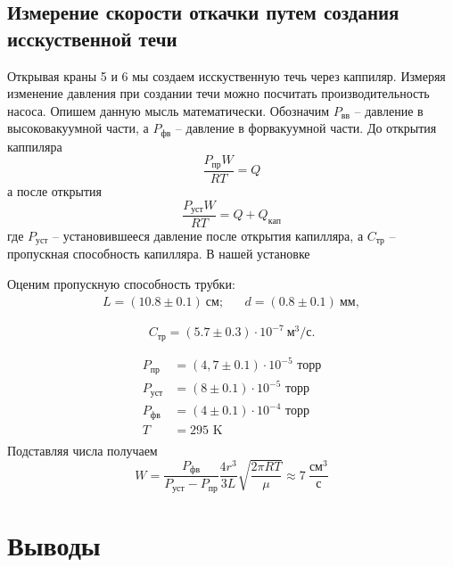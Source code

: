 \documentclass[a4paper,12pt]{article}
\begin{document}
    \newpage

    \subsection*{Измерение скорости откачки путем создания исскуственной течи}
    Открывая краны 5 и 6 мы создаем исскуственную течь через каппиляр. Измеряя изменение давления при создании течи можно посчитать производительность насоса. Опишем данную мысль математически. Обозначим $P_{вв}$ -- давление в высоковакуумной части, а $P_{фв}$ -- давление в форвакуумной части. До открытия каппиляра
    \begin{equation}
        \frac{P_{пр}W}{RT} = Q
    \end{equation}
    а после открытия
    \begin{equation}
        \frac{P_{уст}W}{RT} = Q + Q_{кап}
    \end{equation}
    где $P_{уст}$ -- установившееся давление после открытия капилляра, а $C_{тр}$ -- пропускная способность капилляра. В нашей установке

        Оценим пропускную способность трубки:
		\begin{align}
			L = (10.8 \pm 0.1)~ см; &&   d = (0.8 \pm 0.1) ~ мм,
		\end{align}
		
		\begin{equation}
			C_{тр} = (5.7 \pm 0.3) \cdot  10^{-7} ~ м^3 / с.
		\end{equation}



    \begin{align*}
        P_{пр}&=(4,7 \pm 0.1)\cdot10^{-5} \text{ торр}\\
        P_{уст}&=(8 \pm 0.1)\cdot10^{-5} \text{ торр}\\
        P_{фв}&=(4 \pm 0.1)\cdot 10^{-4} \text{ торр}\\
        T&=295 \text{ K}\\
    \end{align*}
    Подставляя числа получаем
    \begin{equation}
        W = \frac{P_{фв}}{P_{уст}-P_{пр}}\frac{4r^3}{3L}\sqrt{\frac{2\pi RT}{\mu}} \approx 7~\frac{см^3}{с}
    \end{equation}


    \section{Выводы}
\end{document}
